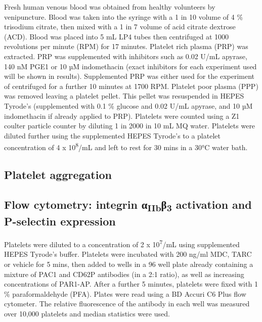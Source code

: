 \documentclass[11pt,twoside]{bristolthesis}
\begin{document}
Fresh human venous blood was obtained from healthy volunteers by venipuncture. Blood was taken into the syringe with a 1 in 10 volume of 4 \% trisodium citrate, then mixed with a 1 in 7 volume of acid citrate dextrose (ACD). Blood was placed into 5 mL LP4 tubes then centrifuged at 1000 revolutions per minute (RPM) for 17 minutes. Platelet rich plasma (PRP) was extracted. PRP was supplemented with inhibitors such as 0.02 U/mL apyrase, 140 nM PGE1 or 10 µM indomethacin (exact inhibitors for each experiment used will be shown in results). Supplemented PRP was either used for the experiment of centrifuged for a further 10 minutes at 1700 RPM. Platelet poor plasma (PPP) was removed leaving a platelet pellet. This pellet was resuspended in HEPES Tyrode's (supplemented with 0.1 \% glucose and 0.02 U/mL apyrase, and 10 µM indomethacin if already applied to PRP). Platelets were counted using a Z1 coulter particle counter by diluting 1 in 2000 in 10 mL MQ water. Platelets were diluted further using the supplemented HEPES Tyrode's to a platelet concentration of 4 x 10\textsuperscript{8}/mL and left to rest for 30 mins in a 30°C water bath.

\hypertarget{platelet-aggregation}{%
\subsection{Platelet aggregation}\label{platelet-aggregation}}

\hypertarget{flow-cytometry-integrin-ux3b1iibux3b23-activation-and-p-selectin-expression}{%
\subsection{\texorpdfstring{Flow cytometry: integrin α\textsubscript{IIb}β\textsubscript{3} activation and P-selectin expression}{Flow cytometry: integrin αIIbβ3 activation and P-selectin expression}}\label{flow-cytometry-integrin-ux3b1iibux3b23-activation-and-p-selectin-expression}}

Platelets were diluted to a concentration of 2 x 10\textsuperscript{7}/mL using supplemented HEPES Tyrode's buffer. Platelets were incubated with 200 ng/ml MDC, TARC or vehicle for 5 mins, then added to wells in a 96 well plate already containing a mixture of PAC1 and CD62P antibodies (in a 2:1 ratio), as well as increasing concentrations of PAR1-AP. After a further 5 minutes, platelets were fixed with 1 \% paraformaldehyde (PFA). Plates were read using a BD Accuri C6 Plus flow cytometer. The relative fluorescence of the antibody in each well was measured over 10,000 platelets and median statistics were used.
\end{document}

